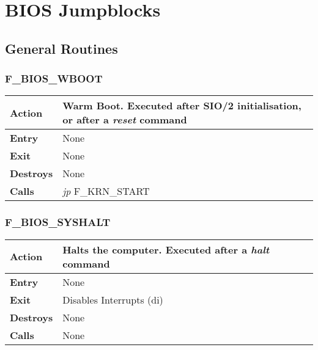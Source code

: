 \documentclass[a4paper,11pt]{article}
\begin{document}
    \pagebreak
    \section{BIOS Jumpblocks}

    \subsection{General Routines}

        \subsubsection{F\_BIOS\_WBOOT}
        \label{func:fbioswboot}
        \begin{tabular}{l p{9cm}}
            \hline\textbf{Action}
            & Warm Boot. Executed after \textbf{SIO/2} initialisation, or after a
            \textit{reset} command \\
            \hline\textbf{Entry} & None \\
            \hline\textbf{Exit} & None \\
            \hline\textbf{Destroys} & None \\
            \hline\textbf{Calls} & \textit{jp} F\_KRN\_START \\
            \hline
        \end{tabular}

        \subsubsection{F\_BIOS\_SYSHALT}
        \label{func:fbiossyshalt}
        \begin{tabular}{l p{9cm}}
            \hline\textbf{Action}
            & Halts the computer. Executed after a \textit{halt} command \\
            \hline\textbf{Entry} & None \\
            \hline\textbf{Exit} & Disables Interrupts (di) \\
            \hline\textbf{Destroys} & None \\
            \hline\textbf{Calls} & None \\
            \hline
        \end{tabular}
\end{document}
